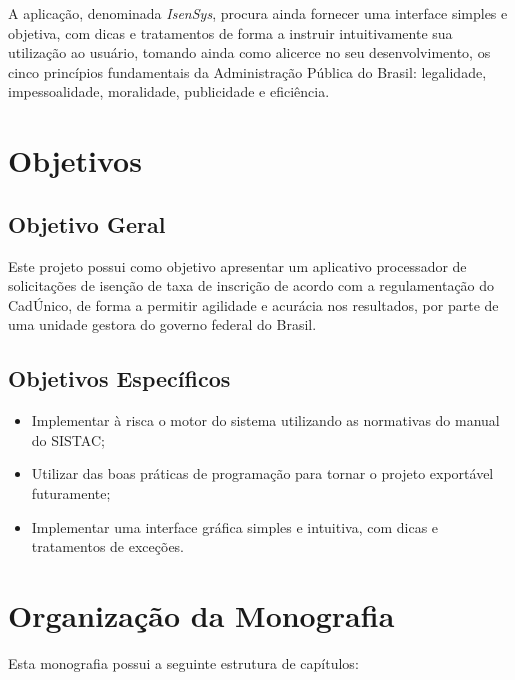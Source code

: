 \documentclass[
	12pt,			%
	openright,		%
	oneside,	
	a4paper,		%
	english,		%
	brazil			%
]{abntex2/abntex2}  %
\begin{document}
	A aplicação, denominada \textit{IsenSys}, procura ainda fornecer uma interface simples e objetiva, com dicas e tratamentos de forma a instruir intuitivamente sua utilização ao usuário, tomando ainda como alicerce no seu desenvolvimento, os cinco princípios fundamentais da Administração Pública do Brasil: legalidade, impessoalidade, moralidade, publicidade e eficiência.

	\section{Objetivos}
	
		\subsection{Objetivo Geral}
		
		Este projeto possui como objetivo apresentar um aplicativo processador de solicitações de isenção de taxa de inscrição de acordo com a regulamentação do CadÚnico, de forma a permitir agilidade e acurácia nos resultados, por parte de uma unidade gestora do governo federal do Brasil.
		
		\subsection{Objetivos Específicos}
		
		\begin{itemize}
			
			\item Implementar à risca o motor do sistema utilizando as normativas do manual do SISTAC;
			\item Utilizar das boas práticas de programação para tornar o projeto exportável futuramente;
			\item Implementar uma interface gráfica simples e intuitiva, com dicas e tratamentos de exceções.
			
		\end{itemize}
		
	\section{Organização da Monografia}
	
		Esta monografia possui a seguinte estrutura de capítulos:
		
\end{document}
